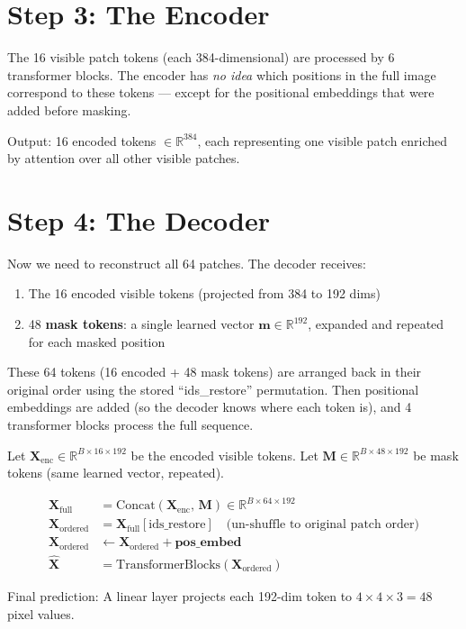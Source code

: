 \documentclass[12pt, a4paper]{report}
\newcommand{\R}{\mathbb{R}}
\newcommand{\mat}[1]{\mathbf{#1}}
\newcommand{\vect}[1]{\bm{#1}}
\begin{document}
\section{Step 3: The Encoder}

The 16 visible patch tokens (each 384-dimensional) are processed by 6 transformer blocks. The encoder has \emph{no idea} which positions in the full image correspond to these tokens — except for the positional embeddings that were added before masking.

Output: 16 encoded tokens $\in \R^{384}$, each representing one visible patch enriched by attention over all other visible patches.

\section{Step 4: The Decoder}

Now we need to reconstruct all 64 patches. The decoder receives:

\begin{enumerate}
    \item The 16 encoded visible tokens (projected from 384 to 192 dims)
    \item 48 \textbf{mask tokens}: a single learned vector $\vect{m} \in \R^{192}$, expanded and repeated for each masked position
\end{enumerate}

These 64 tokens (16 encoded + 48 mask tokens) are arranged back in their original order using the stored ``ids\_restore'' permutation. Then positional embeddings are added (so the decoder knows where each token is), and 4 transformer blocks process the full sequence.

\begin{mathbox}
Let $\mat{X}_{\text{enc}} \in \R^{B \times 16 \times 192}$ be the encoded visible tokens.
Let $\mat{M} \in \R^{B \times 48 \times 192}$ be mask tokens (same learned vector, repeated).

\begin{align}
\mat{X}_{\text{full}} &= \text{Concat}(\mat{X}_{\text{enc}},\, \mat{M}) \in \R^{B \times 64 \times 192} \\
\mat{X}_{\text{ordered}} &= \mat{X}_{\text{full}}[\text{ids\_restore}] \quad \text{(un-shuffle to original patch order)} \\
\mat{X}_{\text{ordered}} &\leftarrow \mat{X}_{\text{ordered}} + \vect{\text{pos\_embed}} \\
\hat{\mat{X}} &= \text{TransformerBlocks}(\mat{X}_{\text{ordered}})
\end{align}

Final prediction: A linear layer projects each 192-dim token to $4 \times 4 \times 3 = 48$ pixel values.
\end{mathbox}
\end{document}
